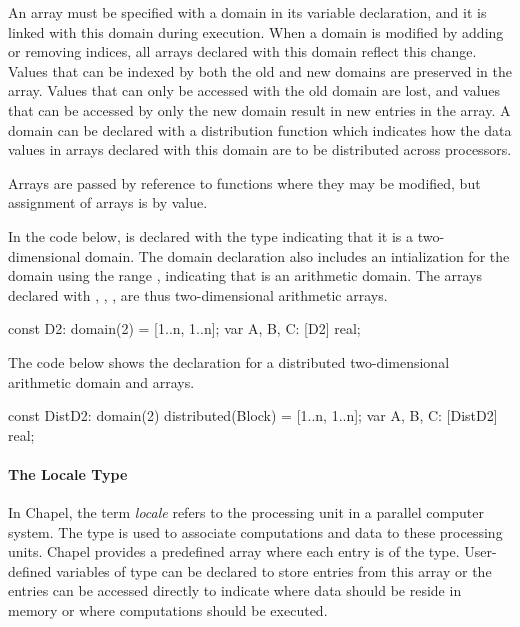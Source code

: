 An array must be specified with a domain in its variable declaration, and 
it is linked with this domain during execution.
When a domain is modified by adding or removing indices, all arrays declared with
this domain reflect this change.  Values that can be indexed by both the
old and new domains are preserved in the array.  Values that can only be
accessed with the old domain are lost, and values that can be accessed by only
the new domain result in new entries in the array.
A domain can be declared with a distribution function which indicates how the 
data values in arrays declared with this domain are to be distributed across
processors.

Arrays are passed by reference to functions
where they may be modified, but assignment of arrays is by value.  

\begin{example}
In the code below,  is declared with the type 
indicating that it is a two-dimensional domain.  The domain declaration
also includes an intialization for the domain using the range ,
indicating that  is an arithmetic domain.  The arrays declared
with , , ,  are thus two-dimensional
arithmetic arrays.
\begin{chapel}
const D2: domain(2) = [1..n, 1..n];
var A, B, C: [D2] real;
\end{chapel}

The code below shows the declaration for a distributed two-dimensional 
arithmetic domain and arrays.
\begin{chapel}
const DistD2: domain(2) distributed(Block) = [1..n, 1..n];
var A, B, C: [DistD2] real;
\end{chapel}
\end{example}

\paragraph{The Locale Type}
In Chapel, the term {\em locale} refers to the processing unit in a parallel
computer system.  The  type is used to associate 
computations and data to these processing units.  Chapel provides
a predefined array  where each entry is of the 
type.  User-defined variables of  type can be declared to store 
entries from this  array or the entries can be accessed 
directly to indicate where data should be reside in memory or where computations
should be executed.   

